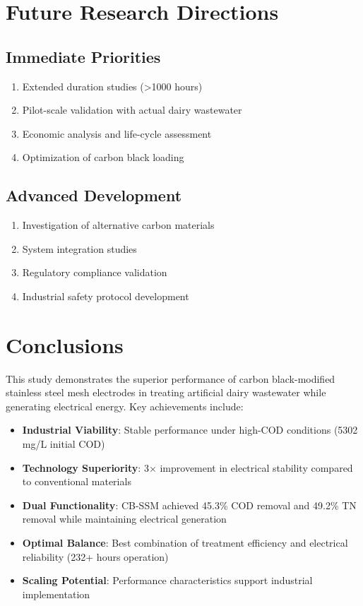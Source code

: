 \documentclass[12pt,a4paper]{article}
\begin{document}
\section{Future Research Directions}

\subsection{Immediate Priorities}

\begin{enumerate}
    \item Extended duration studies (>1000 hours)
    \item Pilot-scale validation with actual dairy wastewater
    \item Economic analysis and life-cycle assessment
    \item Optimization of carbon black loading
\end{enumerate}

\subsection{Advanced Development}

\begin{enumerate}
    \item Investigation of alternative carbon materials
    \item System integration studies
    \item Regulatory compliance validation
    \item Industrial safety protocol development
\end{enumerate}

\section{Conclusions}

This study demonstrates the superior performance of carbon black-modified stainless steel mesh electrodes in treating artificial dairy wastewater while generating electrical energy. Key achievements include:

\begin{itemize}
    \item \textbf{Industrial Viability}: Stable performance under high-COD conditions (5302 mg/L initial COD)
    \item \textbf{Technology Superiority}: 3× improvement in electrical stability compared to conventional materials
    \item \textbf{Dual Functionality}: CB-SSM achieved 45.3\% COD removal and 49.2\% TN removal while maintaining electrical generation
    \item \textbf{Optimal Balance}: Best combination of treatment efficiency and electrical reliability (232+ hours operation)
    \item \textbf{Scaling Potential}: Performance characteristics support industrial implementation
\end{itemize}
\end{document}
